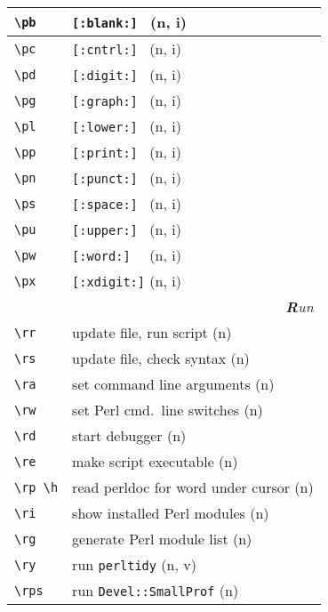 \documentclass[oneside,10pt,landscape,DIV17]{scrartcl}
\begin{document}
\begin{multicols}{3}
\begin{center}
\begin{tabular}[]{|p{11mm}|p{58mm}|}
\hline \verb'\pb' &  \verb'[:blank:] '         \hfill (n, i)   \\
\hline \verb'\pc' &  \verb'[:cntrl:] '         \hfill (n, i)   \\
\hline \verb'\pd' &  \verb'[:digit:] '         \hfill (n, i)   \\
\hline \verb'\pg' &  \verb'[:graph:] '         \hfill (n, i)   \\
\hline \verb'\pl' &  \verb'[:lower:] '         \hfill (n, i)   \\
\hline \verb'\pp' &  \verb'[:print:] '         \hfill (n, i)   \\
\hline \verb'\pn' &  \verb'[:punct:] '         \hfill (n, i)   \\
\hline \verb'\ps' &  \verb'[:space:] '         \hfill (n, i)   \\
\hline \verb'\pu' &  \verb'[:upper:] '         \hfill (n, i)   \\
\hline \verb'\pw' &  \verb'[:word:]  '         \hfill (n, i)   \\
\hline \verb'\px' &  \verb'[:xdigit:]'         \hfill (n, i)   \\
\hline
\hline
\multicolumn{2}{|r|}{\textsl{\textbf{R}un}} \\
\hline \verb'\rr'    & update file, run script              \hfill (n)   \\
\hline \verb'\rs'    & update file, check syntax            \hfill (n)   \\
\hline \verb'\ra'    & set command line arguments           \hfill (n)   \\
\hline \verb'\rw'    & set Perl cmd.\ line switches         \hfill (n)   \\
\hline \verb'\rd'    & start debugger                       \hfill (n)   \\
\hline \verb'\re'    & make script executable               \hfill (n)   \\
\hline \verb'\rp \h' & read perldoc for word under cursor   \hfill (n)   \\
\hline \verb'\ri'    & show installed Perl modules          \hfill (n)   \\
\hline \verb'\rg'    & generate Perl module list            \hfill (n)   \\
\hline \verb'\ry'    & run \verb'perltidy'                  \hfill (n, v)\\
\hline \verb'\rps'   & run \verb'Devel::SmallProf'          \hfill (n)   \\

\end{tabular}
\end{center}
\end{multicols}
\end{document}
